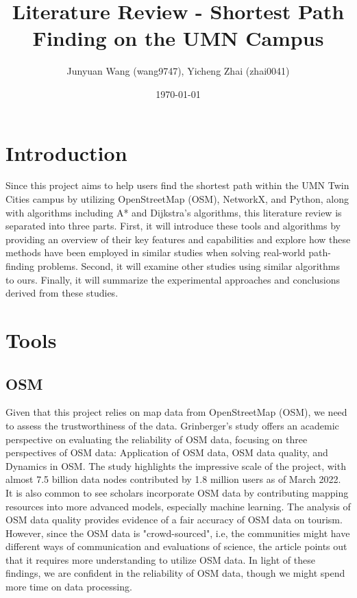 \documentclass[12pt]{article}
\title{Literature Review - Shortest Path Finding on the UMN Campus}
\author{Junyuan Wang (wang9747), Yicheng Zhai (zhai0041)}
\date{\today}
\begin{document}
\maketitle

\section{Introduction}
Since this project aims to help users find the shortest path within the UMN Twin Cities campus by utilizing OpenStreetMap (OSM), NetworkX, and Python, along with algorithms including A* and Dijkstra's algorithms, this literature review is separated into three parts. First, it will introduce these tools and algorithms by providing an overview of their key features and capabilities and explore how these methods have been employed in similar studies when solving real-world path-finding problems. Second, it will examine other studies using similar algorithms to ours. Finally, it will summarize the experimental approaches and conclusions derived from these studies. 


\section{Tools}
\subsection{OSM}
Given that this project relies on map data from OpenStreetMap (OSM), we need to assess the trustworthiness of the data. Grinberger's study \cite{Grinberger_Minghini_Juhász_Yeboah_Mooney_2022} offers an academic perspective on evaluating the reliability of OSM data, focusing on three perspectives of OSM data: Application of OSM data, OSM data quality, and Dynamics in OSM. The study highlights the impressive scale of the project, with almost 7.5 billion data nodes contributed by 1.8 million users as of March 2022. It is also common to see scholars incorporate OSM data by contributing mapping resources into more advanced models, especially machine learning. The analysis of OSM data quality provides evidence of a fair accuracy of OSM data on tourism. However, since the OSM data is "crowd-sourced", i.e, the communities might have different ways of communication and evaluations of science, the article points out that it requires more understanding to utilize OSM data. In light of these findings, we are confident in the reliability of OSM data, though we might spend more time on data processing.
\end{document}
